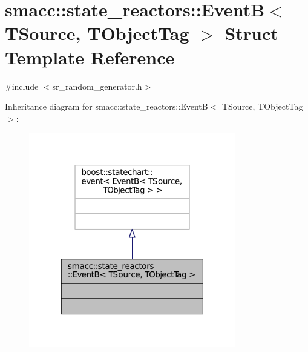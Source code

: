 \hypertarget{structsmacc_1_1state__reactors_1_1EventB}{}\section{smacc\+:\+:state\+\_\+reactors\+:\+:EventB$<$ T\+Source, T\+Object\+Tag $>$ Struct Template Reference}
\label{structsmacc_1_1state__reactors_1_1EventB}


{\ttfamily \#include $<$sr\+\_\+random\+\_\+generator.\+h$>$}



Inheritance diagram for smacc\+:\+:state\+\_\+reactors\+:\+:EventB$<$ T\+Source, T\+Object\+Tag $>$\+:
\nopagebreak
\begin{figure}[H]
\begin{center}
\leavevmode
\includegraphics[width=256pt]{structsmacc_1_1state__reactors_1_1EventB__inherit__graph}
\end{center}
\end{figure}


